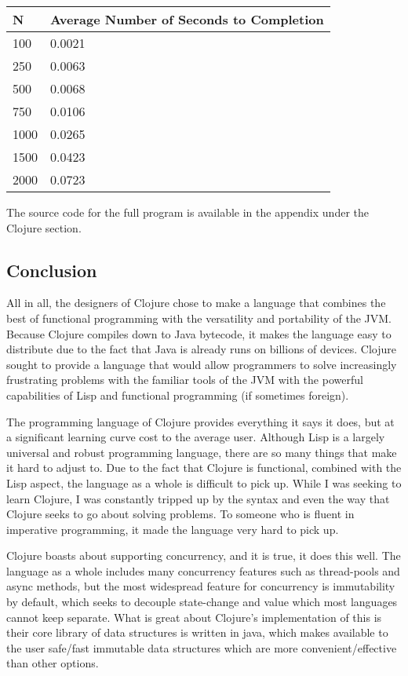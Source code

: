     \begin{center}
    \begin{tabular}{ | m{5em} | m{10em} | }  
    \hline
    N & Average Number of Seconds to Completion \\ [0.5ex] 
    \hline\hline
    100 & 0.0021 \\ \hline
    250 & 0.0063 \\ \hline
    500 & 0.0068 \\ \hline
    750 & 0.0106 \\ \hline
    1000 & 0.0265 \\ \hline
    1500 & 0.0423 \\ \hline
    2000 & 0.0723 \\ [1ex] 
    \hline
    \end{tabular}
    \end{center}
    
    The source code for the full program is available in the appendix under the Clojure section.

\subsection{Conclusion}

    All in all, the designers of Clojure chose to make a language that combines the best of functional programming with the versatility and portability of the JVM. Because Clojure compiles down to Java bytecode, it makes the language easy to distribute due to the fact that Java is already runs on billions of devices. Clojure sought to provide a language that would allow programmers to solve increasingly frustrating problems with the familiar tools of the JVM with the powerful capabilities of Lisp and functional programming (if sometimes foreign).
    
    The programming language of Clojure provides everything it says it does, but at a significant learning curve cost to the average user. Although Lisp is a largely universal and robust programming language, there are so many things that make it hard to adjust to. Due to the fact that Clojure is functional, combined with the Lisp aspect, the language as a whole is difficult to pick up. While I was seeking to learn Clojure, I was constantly tripped up by the syntax and even the way that Clojure seeks to go about solving problems. To someone who is fluent in imperative programming, it made the language very hard to pick up.
    
    Clojure boasts about supporting concurrency, and it is true, it does this well. The language as a whole includes many concurrency features such as thread-pools and async methods, but the most widespread feature for concurrency is immutability by default, which seeks to decouple state-change and value which most languages cannot keep separate. What is great about Clojure's implementation of this is their core library of data structures is written in java, which makes available to the user safe/fast immutable data structures which are more convenient/effective than other options. 
    
